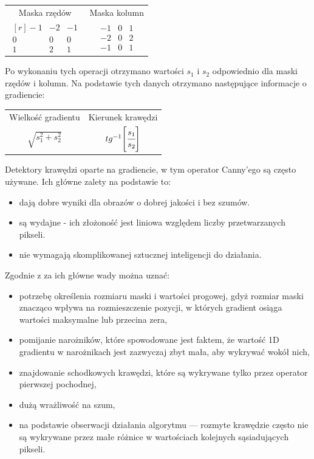 \documentclass[a4paper,11pt,twoside,openright]{report}
\theoremstyle{definition}
\begin{document}
\begin{table}[h!]
\centering
\begin{tabular} { c c }
  Maska rzędów & Maska kolumn \\
$
\begin{matrix*}[r]
-1 & -2 & -1 \\
0 & 0 & 0 \\
1 & 2 & 1
\end{matrix*}$
&
$\begin{matrix}
-1 & 0 & 1 \\
-2 & 0 & 2 \\
-1 & 0 & 1
\end{matrix}$
\end{tabular}
\end{table}

Po wykonaniu tych operacji otrzymano wartości $s_1$ i $s_2$ odpowiednio dla maski
rzędów i kolumn. Na podstawie tych danych otrzymano następujące informacje o gradiencie:
\begin{table}[h!]
\centering
\begin{tabular} { c c }
  Wielkość gradientu & Kierunek krawędzi \\
$\sqrt{s_1^2 + s_2^2}$ & $tg^{-1} \Bigg[ {\cfrac{s_1}{s_2}} \Bigg]$
\end{tabular}
\end{table}

Detektory krawędzi oparte na gradiencie, w tym operator Canny'ego są często używane.
Ich główne zalety na podstawie \cite{Cyfrowe przetwarzanie obrazów medycznych} to:
\begin{itemize}[noitemsep]
\item dają dobre wyniki dla obrazów o dobrej jakości i bez szumów.
\item są wydajne - ich złożoność jest liniowa względem liczby przetwarzanych pikseli.
\item nie wymagają skomplikowanej sztucznej inteligencji do działania.
\end{itemize}

Zgodnie z \cite{Cyfrowe przetwarzanie obrazów medycznych} za ich główne wady można uznać:
\begin{itemize}[noitemsep]
\item potrzebę określenia rozmiaru maski i wartości progowej, gdyż rozmiar maski
znacząco wpływa na rozmieszczenie pozycji, w których gradient osiąga wartości
maksymalne lub przecina zera,
\item pomijanie narożników, które spowodowane jest faktem, że wartość 1D gradientu
w narożnikach jest zazwyczaj zbyt mała, aby wykrywać wokół nich,
\item znajdowanie schodkowych krawędzi, które są wykrywane tylko przez operator pierwszej pochodnej,
\item dużą wrażliwość na szum,
\item na podstawie obserwacji działania algorytmu --- rozmyte krawędzie często
nie są wykrywane przez małe różnice w wartościach kolejnych sąsiadujących pikseli.
\end{itemize}
\end{document}
